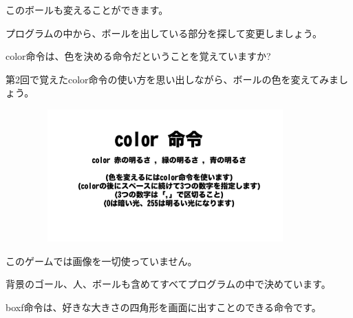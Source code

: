 \documentclass[a4paper,dvipdfmx]{jarticle}
\begin{document}
\bigskip


\bigskip


\bigskip


\bigskip


\bigskip


\bigskip


\bigskip

このボールも変えることができます。

プログラムの中から、ボールを出している部分を探して変更しましょう。


\bigskip

color命令は、色を決める命令だということを覚えていますか?

第2回で覚えたcolor命令の使い方を思い出しながら、ボールの色を変えてみましょう。


\bigskip



\begin{center}
\includegraphics[width=12.277cm,height=5.08cm]{text04-img/text04-img009.png}

\end{center}

\bigskip


\bigskip


\bigskip


\bigskip


\bigskip


\bigskip


\bigskip


\bigskip


\bigskip


\bigskip


\bigskip


\bigskip


\bigskip

このゲームでは画像を一切使っていません。

背景のゴール、人、ボールも含めてすべてプログラムの中で決めています。

boxf命令は、好きな大きさの四角形を画面に出すことのできる命令です。
\end{document}
